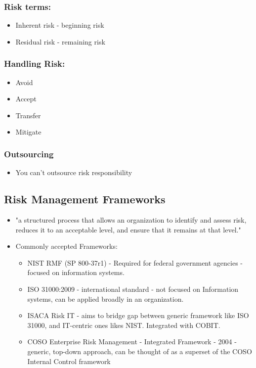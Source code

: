\documentclass[11pt]{article}
\begin{document}
\subsubsection{Risk terms:}
\label{sec:org0b527dd}
\begin{itemize}
\item Inherent risk - beginning risk
\item Residual risk - remaining risk
\end{itemize}
\subsubsection{Handling Risk:}
\label{sec:org1682dcc}
\begin{itemize}
\item Avoid
\item Accept
\item Transfer
\item Mitigate
\end{itemize}
\subsubsection{Outsourcing}
\label{sec:org59bc7ca}
\begin{itemize}
\item You can't outsource risk responsibility
\end{itemize}
\subsection{Risk Management Frameworks}
\label{sec:org99a1314}
\begin{itemize}
\item "a structured process that allows an organization to identify and assess risk, reduces it to an acceptable level, and ensure that it remains at that level."
\item Commonly accepted Frameworks:
\begin{itemize}
\item NIST RMF (SP 800-37r1) - Required for federal government agencies - focused on information systems.
\item ISO 31000:2009 - international standard - not focused on Information systems, can be applied broadly in an organization.
\item ISACA Risk IT - aims to bridge gap between generic framework like ISO 31000, and IT-centric ones likes NIST. Integrated with COBIT.
\item COSO Enterprise Risk Management - Integrated Framework - 2004 - generic, top-down approach, can be thought of as a superset of the COSO Internal Control framework
\end{itemize}
\end{itemize}
\end{document}
